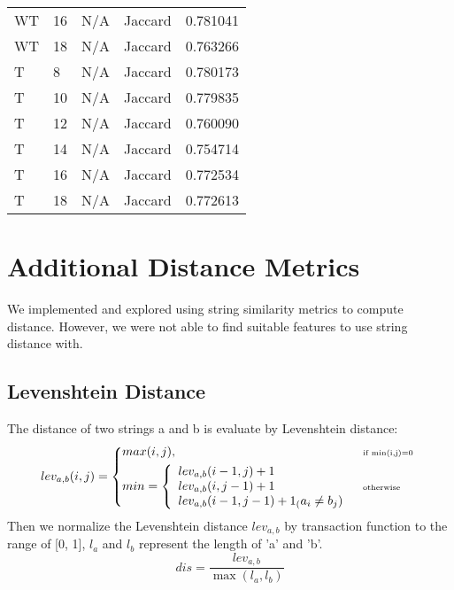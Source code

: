 \documentclass{article}
\begin{document}
\begin{center}
\begin{supertabular}{| l | l | l | l | l |}
            WT & 16 & N/A & Jaccard & 0.781041 \\
            WT & 18 & N/A & Jaccard & 0.763266 \\
            T & 8 & N/A & Jaccard & 0.780173 \\
            T & 10 & N/A & Jaccard & 0.779835 \\
            T & 12 & N/A & Jaccard & 0.760090 \\
            T & 14 & N/A & Jaccard & 0.754714 \\
            T & 16 & N/A & Jaccard & 0.772534 \\
            T & 18 & N/A & Jaccard & 0.772613 \\
      \end{supertabular}
\end{center}

\section{Additional Distance Metrics}
\label{additional-distance-metrics}

We implemented and explored using string similarity metrics to compute distance.
However, we were not able to find suitable features to use string distance with.

\subsection{Levenshtein Distance}
The distance of two strings a and b is evaluate by Levenshtein distance:
\begin{equation}
  lev_{a,b}(i,j) = \left \{
  \begin{aligned}
    &max(i,j), && \text{\tiny if min(i,j)=0}\  \\
    &
    min= \left\{
    \begin{array}{ll}
    lev_{a,b}(i-1,j)+1\\
    lev_{a,b}(i,j-1)+1\\
    lev_{a,b}(i-1,j-1)+1_(a_{i}\not=b_{j})
    \end{array}\right.
    && \text{\tiny otherwise}
  \end{aligned} \right.
\end{equation}
Then we normalize the Levenshtein distance $lev_{a,b}$ by transaction function to the range of [0, 1], $l_{a}$ and $l_{b}$ represent the length of 'a' and 'b'.
$$dis = \frac{lev_{a,b}}{{\max}(l_{a}, l_{b})}  $$
\end{document}
